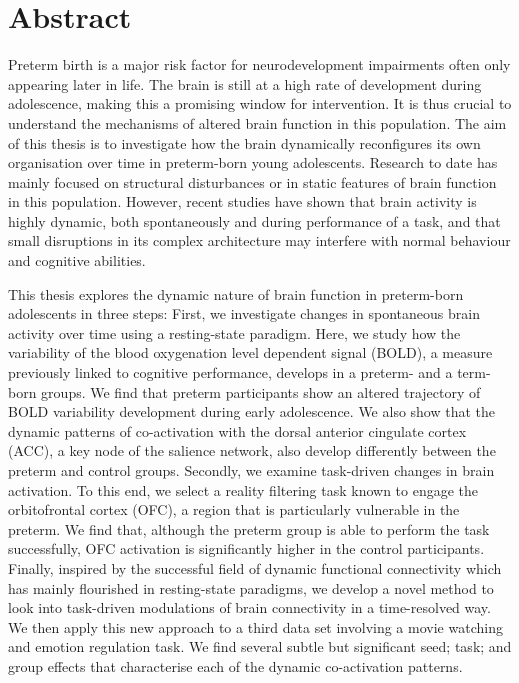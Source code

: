 

\cleardoublepage
\chapter*{Abstract}





Preterm birth is a major risk factor for neurodevelopment impairments often only appearing later in life. The brain is still at a high rate of development during adolescence, making this a promising window for intervention. It is thus crucial to understand the mechanisms of altered brain function in this population. The aim of this thesis is to investigate how the brain dynamically reconfigures its own organisation over time in preterm-born young adolescents. Research to date has mainly focused on structural disturbances or in static features of brain function in this population. However, recent studies have shown that brain activity is highly dynamic, both spontaneously and during performance of a task, and that small disruptions in its complex architecture may interfere with normal behaviour and cognitive abilities.   


\hspace{1cm} This thesis explores the dynamic nature of brain function in preterm-born adolescents in three steps: First, we investigate changes in spontaneous brain activity over time using a resting-state paradigm. Here, we study how the variability of the blood oxygenation level dependent signal (BOLD), a measure previously linked to cognitive performance, develops in a preterm- and a term-born groups. We find that preterm participants show an altered trajectory of BOLD variability development during early adolescence. We also show that the dynamic patterns of co-activation with the dorsal anterior cingulate cortex (ACC), a key node of the salience network, also develop differently between the preterm and control groups. Secondly, we examine task-driven changes in brain activation. To this end, we select a reality filtering task known to engage the orbitofrontal cortex (OFC), a region that is particularly vulnerable in the preterm. We find that, although the preterm group is able to perform the task successfully, OFC activation is significantly higher in the control participants. Finally, inspired by the successful field of dynamic functional connectivity which has mainly flourished in resting-state paradigms, we develop a novel method to look into task-driven modulations of brain connectivity in a time-resolved way. We then apply this new approach to a third data set involving a movie watching and emotion regulation task. We find several subtle but significant seed; task; and group effects that characterise each of the dynamic co-activation patterns.  

